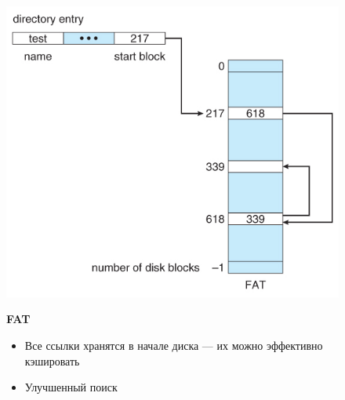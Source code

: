 \documentclass[../../lectures.tex]{subfiles}
\begin{document}
\begin{figure}[H]
\captionsetup{singlelinecheck=off}
\begin{minipage}[c]{0.5\linewidth}
\centering
\includegraphics[width=\textwidth]{images/fat-table.jpg}
\end{minipage}
\hspace{0.5cm}
\begin{minipage}[c]{0.5\linewidth}
\centering
\textbf{FAT}
\begin{itemize}
    \item Все ссылки хранятся в начале диска --- их можно эффективно кэшировать
    \item Улучшенный поиск
\end{itemize}
\end{minipage}
\end{figure}
\end{document}
